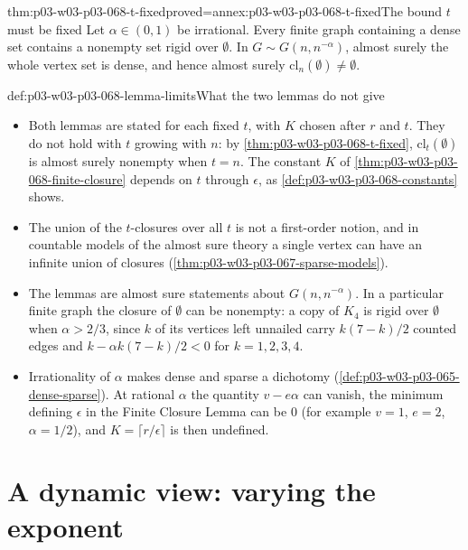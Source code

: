 \begin{hbtheorem}{thm:p03-w03-p03-068-t-fixed}{proved=annex:p03-w03-p03-068-t-fixed}{The bound \(t\) must be fixed}
Let \(\alpha\in(0,1)\) be irrational.  Every finite graph containing a dense set contains a
nonempty set rigid over \(\emptyset\).  In \(G\sim G(n,n^{-\alpha})\), almost
surely the whole vertex set is dense, and hence almost surely
\(\mathrm{cl}_n(\emptyset)\neq\emptyset\).
\end{hbtheorem}

\begin{hbwarning}{def:p03-w03-p03-068-lemma-limits}{What the two lemmas do not give}
\begin{itemize}
\item Both lemmas are stated for each fixed \(t\), with \(K\) chosen after
\(r\) and \(t\).  They do not hold with \(t\) growing with \(n\):
by \cref{thm:p03-w03-p03-068-t-fixed}, \(\mathrm{cl}_t(\emptyset)\) is
almost surely nonempty when \(t=n\).  The constant \(K\) of
\cref{thm:p03-w03-p03-068-finite-closure} depends on \(t\) through
\(\epsilon\), as \cref{def:p03-w03-p03-068-constants} shows.
\item The union of the \(t\)-closures over all \(t\) is not a first-order
notion, and in countable models of the almost sure theory a single vertex
can have an infinite union of closures
(\cref{thm:p03-w03-p03-067-sparse-models}).
\item The lemmas are almost sure statements about \(G(n,n^{-\alpha})\).  In
a particular finite graph the closure of \(\emptyset\) can be nonempty: a
copy of \(K_4\) is rigid over \(\emptyset\) when \(\alpha>2/3\), since \(k\) of
its vertices left unnailed carry \(k(7-k)/2\) counted edges and
\(k-\alpha k(7-k)/2<0\) for \(k=1,2,3,4\).
\item Irrationality of \(\alpha\) makes dense and sparse a dichotomy
(\cref{def:p03-w03-p03-065-dense-sparse}).  At rational \(\alpha\) the
quantity \(v-e\alpha\) can vanish, the minimum defining \(\epsilon\) in the
Finite Closure Lemma can be \(0\) (for example \(v=1\), \(e=2\),
\(\alpha=1/2\)), and \(K=\lceil r/\epsilon\rceil\) is then undefined.
\end{itemize}
\end{hbwarning}

\section{A dynamic view: varying the exponent}
\label{sec:p03-w03-p03-068-dynamic}

